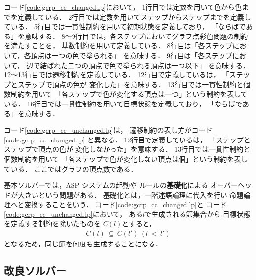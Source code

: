 コード\ref{code:gcrp_cc_changed.lp}において，
1行目では定数を用いて色から色までを定義している．
2行目では定数を用いてステップからステップまでを定義している．
5行目では一貫性制約を用いて初期状態を定義しており，
「ならばである」を意味する．
8～9行目では，各ステップにおいてグラフ点彩色問題の制約を満たすことを，
基数制約を用いて定義している．
8行目は「各ステップにおいて，各頂点は一つの色で塗られる」
を意味する．
9行目は「各ステップにおいて，
辺で結ばれた二つの頂点で色で塗られる頂点は一つ以下」
を意味する．
12～13行目では遷移制約を定義している．
12行目で定義しているは，
「ステップとステップで頂点の色が
変化した」を意味する．
13行目では一貫性制約と個数制約を用いて
「各ステップで色が変化する頂点は一つ」という制約を表している．
16行目では一貫性制約を用いて目標状態を定義しており，
「ならばである」を意味する．

コード\ref{code:gcrp_cc_unchanged.lp}は，
遷移制約の表し方がコード\ref{code:gcrp_cc_changed.lp}
と異なる．
12行目で定義しているは，
「ステップとステップで頂点の色が
変化しなかった」を意味する．
13行目では一貫性制約と個数制約を用いて
「各ステップで色が変化しない頂点は個」という制約を表している．
ここではグラフの頂点数である．

基本ソルバーでは，ASP システムの起動や
ルールの\textbf{基礎化}による
オーバーヘッドが大きいという問題がある．
基礎化とは，一階述語論理に代入を行い
命題論理へと変換することをいう．
コード\ref{code:gcrp_cc_changed.lp}と
コード\ref{code:gcrp_cc_unchanged.lp}において，
ある$l$で生成される節集合から
目標状態を定義する制約を除いたものを
$C(l)$とすると，
\begin{align}
  C(l) \: \subseteq \: C(l') \: (l \: < \: l')
\end{align}
となるため，同じ節を何度も生成することになる．

\subsection{改良ソルバー}





